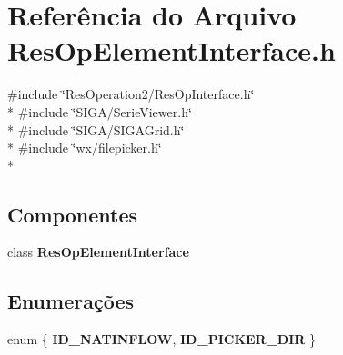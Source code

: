 \section{Referência do Arquivo Res\+Op\+Element\+Interface.\+h}
\label{_res_op_element_interface_8h}
{\ttfamily \#include \char`\"{}Res\+Operation2/\+Res\+Op\+Interface.\+h\char`\"{}}\\*
{\ttfamily \#include \char`\"{}S\+I\+G\+A/\+Serie\+Viewer.\+h\char`\"{}}\\*
{\ttfamily \#include \char`\"{}S\+I\+G\+A/\+S\+I\+G\+A\+Grid.\+h\char`\"{}}\\*
{\ttfamily \#include \char`\"{}wx/filepicker.\+h\char`\"{}}\\*
\subsection*{Componentes}
\begin{DoxyCompactItemize}
\item 
class {\bf Res\+Op\+Element\+Interface}
\end{DoxyCompactItemize}
\subsection*{Enumerações}
\begin{DoxyCompactItemize}
\item 
enum \{ {\bf I\+D\+\_\+\+N\+A\+T\+I\+N\+F\+L\+OW}, 
{\bf I\+D\+\_\+\+P\+I\+C\+K\+E\+R\+\_\+\+D\+IR}
 \}
\end{DoxyCompactItemize}

